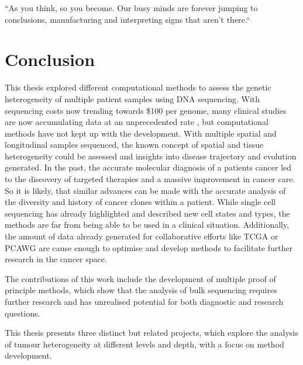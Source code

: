 
\begin{savequote}[85mm]
``As you think, so you become. Our busy minds are forever jumping to conclusions, manufacturing and interpreting signs that aren’t there.``
\end{savequote}


\chapter{Conclusion}
\label{ch:conclusion}
\fancyhead[RE,LO]{\rightmark}

This thesis explored different computational methods to assess the genetic heterogeneity of multiple patient samples using DNA sequencing. With sequencing costs now trending towards \$100 per genome, many clinical studies are now accumulating data at an unprecedented rate \cite{Stephens2015}, but computational methods have not kept up with the development. With multiple spatial and longitudinal samples sequenced, the known concept of spatial and tissue heterogeneity could be assessed and insights into disease trajectory and evolution generated. In the past, the accurate molecular diagnosis of a patients cancer led to the discovery of targeted therapies and a massive improvement in cancer care. So it is likely, that similar advances can be made with the accurate analysis of the diversity and history of cancer clones within a patient. While single cell sequencing has already highlighted and described new cell states and types, the methods are far from being able to be used in a clinical situation. Additionally, the amount of data already generated for collaborative efforts like TCGA \cite{IPCAWGC2020} or PCAWG are cause enough to optimise and develop methods to facilitate further research in the cancer space.

The contributions of this work include the development of multiple proof of principle methods, which show that the analysis of bulk sequencing requires further research and has unrealised potential for both diagnostic and research questions.

This thesis presents three distinct but related projects, which explore the analysis of tumour heterogeneity at different levels and depth, with a focus on method development.

